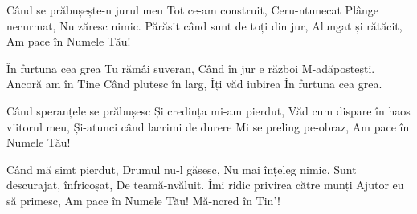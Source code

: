 \beginverse
Când se prăbușește-n jurul meu
Tot ce-am construit,
Ceru-ntunecat
Plânge necurmat,
Nu zăresc nimic.
Părăsit când sunt de toți din jur,
Alungat și rătăcit,
Am pace în Numele Tău!
\endverse

\beginchorus
În furtuna cea grea
Tu rămâi suveran,
Când în jur e război
M-adăpostești.
Ancoră am în Tine
Când plutesc în larg,
Îți văd iubirea
În furtuna cea grea.
\endchorus

\beginverse
Când speranțele se prăbușesc
Și credința mi-am pierdut,
Văd cum dispare în haos viitorul meu,
Și-atunci când lacrimi de durere
Mi se preling pe-obraz,
Am pace în Numele Tău!
\endverse

\beginverse
Când mă simt pierdut,
Drumul nu-l găsesc,
Nu mai înțeleg nimic.
Sunt descurajat, înfricoșat,
De teamă-nvăluit.
Îmi ridic privirea către munți
Ajutor eu să primesc,
Am pace în Numele Tău!
Mă-ncred în Tin'!
\endverse
\endsong